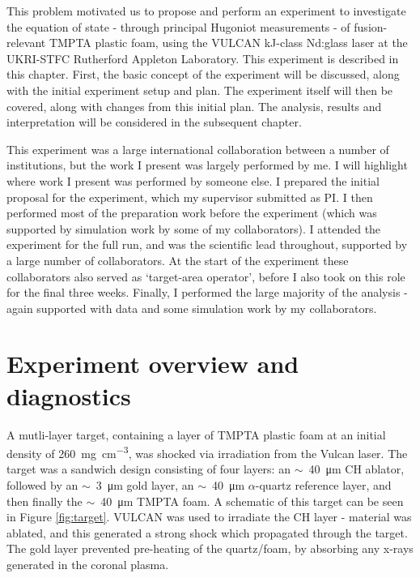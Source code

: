 This problem motivated us to propose and perform an experiment to investigate the equation of state - through principal Hugoniot measurements - of fusion-relevant TMPTA plastic foam, using the VULCAN kJ-class Nd:glass laser at the UKRI-STFC Rutherford Appleton Laboratory. This experiment is described in this chapter. First, the basic concept of the experiment will be discussed, along with the initial experiment setup and plan. The experiment itself will then be covered, along with changes from this initial plan. The analysis, results and interpretation will be considered in the subsequent chapter.

This experiment was a large international collaboration between a number of institutions, but the work I present was largely performed by me. I will highlight where work I present was performed by someone else. I prepared the initial proposal for the experiment, which my supervisor submitted as PI. I then performed most of the preparation work before the experiment (which was supported by simulation work by some of my collaborators). I attended the experiment for the full run, and was the scientific lead throughout, supported by a large number of collaborators. At the start of the experiment these collaborators also served as `target-area operator', before I also took on this role for the final three weeks. Finally, I performed the large majority of the analysis - again supported with data and some simulation work by my collaborators.

\section{Experiment overview and diagnostics}

A mutli-layer target, containing a layer of TMPTA plastic foam at an initial density of 260~\unit{\milli\gram\per\centi\meter\cubed}, was shocked via irradiation from the Vulcan laser. The target was a sandwich design consisting of four layers: an $\sim$~40~\si[per-mode=symbol]{\micro\meter} CH ablator, followed by an $\sim$~3~\si[per-mode=symbol]{\micro\meter} gold layer, an $\sim$~40~\si[per-mode=symbol]{\micro\meter} $\alpha$-quartz reference layer, and then finally the $\sim$~40~\si[per-mode=symbol]{\micro\meter} TMPTA foam. A schematic of this target can be seen in Figure \ref{fig:target}. VULCAN was used to irradiate the CH layer - material was ablated, and this generated a strong shock which propagated through the target. The gold layer prevented pre-heating of the quartz/foam, by absorbing any x-rays generated in the coronal plasma.

